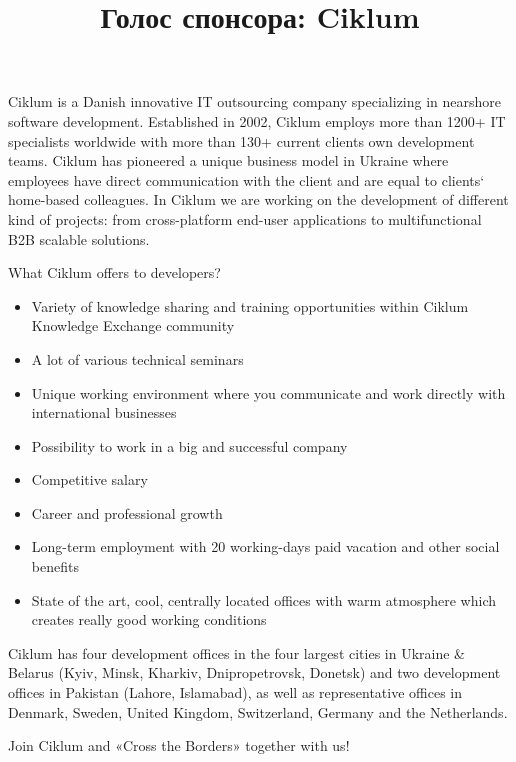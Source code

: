 \documentclass[10pt, a5paper]{article}
\begin{document}
\title{Голос спонсора: Ciklum}
\date{}
\maketitle
\begin{figure}[ht]
\end{figure}

Ciklum is a Danish innovative IT outsourcing company specializing in nearshore software development. 
Established in 2002, Ciklum employs more than 1200+ IT specialists worldwide with more than 130+ current clients own development teams. Ciklum has pioneered a unique business model in Ukraine where employees have direct communication with the client and are equal to clients` home-based colleagues. In Ciklum we are working on the development of different kind of projects: from cross-platform end-user applications to multifunctional B2B scalable solutions.

What Ciklum offers to developers?
\begin{itemize}
\item Variety of knowledge sharing and training opportunities within Ciklum Knowledge Exchange community
\item A lot of various technical seminars
\item Unique working environment where you communicate and work directly with international businesses
\item Possibility to work in a big and successful company
\item Competitive salary
\item Career and professional growth 
\item Long-term employment with 20 working-days paid vacation and other social benefits 
\item State of the art, cool, centrally located offices with warm atmosphere which creates really good working conditions
\end{itemize}

Ciklum has four development offices in the four largest cities in Ukraine \& Belarus (Kyiv, Minsk, Kharkiv, Dnipropetrovsk, Donetsk) and two development offices in Pakistan (Lahore, Islamabad), as well as representative offices in Denmark, Sweden, United Kingdom, Switzerland, Germany and the Netherlands. 

Join Ciklum and «Cross the Borders» together with us!

\begin{figure}[hb]
\end{figure}
\end{document}
